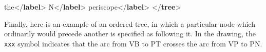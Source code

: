 \begin{shaded}
\mbox{}\newline 
\hspace*{1em}the{</\textbf{label}>}\mbox{}\newline 
{}\mbox{}\newline 
{}\mbox{}\newline 
\hspace*{1em}N{</\textbf{label}>}\mbox{}\newline 
{}\mbox{}\newline 
{}\mbox{}\newline 
\hspace*{1em}periscope{</\textbf{label}>}\mbox{}\newline 
{}\mbox{}\newline 
{</\textbf{tree}>}\end{shaded}\egroup\par \par
Finally, here is an example of an ordered tree, in which a particular node which ordinarily would precede another is specified as following it. In the drawing, the \texttt{xxx} symbol indicates that the arc from VB to PT crosses the arc from VP to PN.\par
